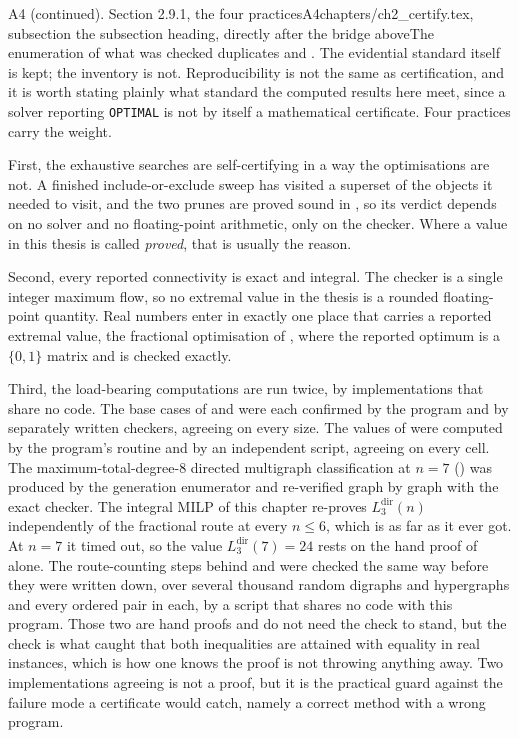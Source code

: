 \begin{offcutrewrite}{A4 (continued). Section 2.9.1, the four practices}{A4}{chapters/ch2\_certify.tex, subsection }{the subsection heading, directly after the bridge above}{The enumeration of what was checked duplicates  and . The evidential standard itself is kept; the inventory is not.}
Reproducibility is not the same as certification, and it is worth stating plainly what standard the computed results here meet, since a solver reporting \texttt{OPTIMAL} is not by itself a mathematical certificate. Four practices carry the weight.

First, the exhaustive searches are self-certifying in a way the optimisations are not. A finished include-or-exclude sweep has visited a superset of the objects it needed to visit, and the two prunes are proved sound in , so its verdict depends on no solver and no floating-point arithmetic, only on the checker. Where a value in this thesis is called \emph{proved}, that is usually the reason.

Second, every reported connectivity is exact and integral. The checker is a single integer maximum flow, so no extremal value in the thesis is a rounded floating-point quantity. Real numbers enter in exactly one place that carries a reported extremal value, the fractional optimisation of , where the reported optimum is a $\{0,1\}$ matrix and is checked exactly.

Third, the load-bearing computations are run twice, by implementations that share no code. The base cases of  and  were each confirmed by the program and by separately written checkers, agreeing on every size. The values of  were computed by the program's routine and by an independent script, agreeing on every cell. The maximum-total-degree-$8$ directed multigraph classification at $n = 7$ () was produced by the generation enumerator and re-verified graph by graph with the exact checker. The integral MILP of this chapter re-proves $L_3^{\mathrm{dir}}(n)$ independently of the fractional route at every $n \le 6$, which is as far as it ever got. At $n = 7$ it timed out, so the value $L_3^{\mathrm{dir}}(7) = 24$ rests on the hand proof of  alone. The route-counting steps behind  and  were checked the same way before they were written down, over several thousand random digraphs and hypergraphs and every ordered pair in each, by a script that shares no code with this program. Those two are hand proofs and do not need the check to stand, but the check is what caught that both inequalities are attained with equality in real instances, which is how one knows the proof is not throwing anything away. Two implementations agreeing is not a proof, but it is the practical guard against the failure mode a certificate would catch, namely a correct method with a wrong program.


\end{offcutrewrite}

